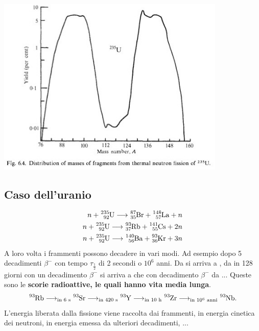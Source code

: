 \documentclass[a4paper,11pt,twoside,openany]{book}
\theoremstyle{definition}
\theoremstyle{plain}
\theoremstyle{plain}
\theoremstyle{definition}
\begin{document}
\begin{center}
\includegraphics[width=4.3in]{immagini/mass_fission.jpg} %
\end{center}

\subsection{Caso dell'uranio} %
\begin{equation}\begin{split}
n+\ce{^{235}_{92}U}\longrightarrow \ce{^{87}_{35}Br}+\ce{^{148}_{57}La}+n \\
n+\ce{^{235}_{92}U}\longrightarrow \ce{^{93}_{37}Rb}+\ce{^{141}_{55}Cs}+2n \\
n+\ce{^{235}_{92}U}\longrightarrow \ce{^{140}_{56}Ba}+\ce{^{93}_{36}Kr}+3n
\end{split}\end{equation}
A loro volta i frammenti possono decadere in vari modi. Ad esempio dopo 5 decadimenti $\beta^-$ con tempo $\tau_{\frac{1}{2}}$ di 2 secondi o $10^6$ anni. Da  si arriva a , da  in 128 giorni con un decadimento $\beta^-$ si arriva a  che con decadimento $\beta^-$ da ... Queste sono le \textbf{scorie radioattive, le quali hanno vita media lunga}. $$\ce{^{93}Rb}\longrightarrow_{\textrm{in 6 s}} \ce{^{93}Sr}\longrightarrow_{\textrm{in 420 s}} \ce{^{93}Y} \longrightarrow_{\textrm{in 10 h}} \ce{^{93}Zr}\longrightarrow_{\textrm{in }10^{6}\textrm{ anni}} \ce{^{93}Nb}.$$ L'energia liberata dalla fissione viene raccolta dai frammenti, in energia cinetica dei neutroni, in energia emessa da ulteriori decadimenti, ...
\end{document}
